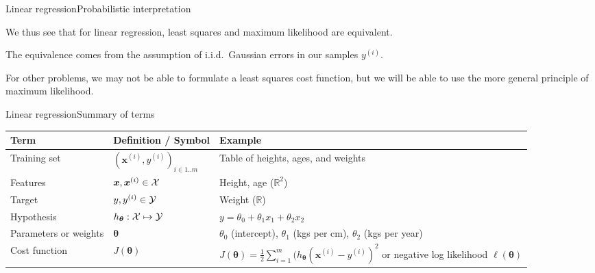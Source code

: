 \documentclass{beamer}
\renewcommand{\vec}[1]{\boldsymbol{#1}}
\def\Rset{\mathbb{R}}
\begin{document}
\begin{frame}{Linear regression}{Probabilistic interpretation}

  We thus see that for linear regression, \alert{least squares and
    maximum likelihood are equivalent}.

  \medskip

  The equivalence comes from the assumption of i.i.d.\ Gaussian errors
  in our samples $y^{(i)}$.
  
  \medskip

  For other problems, we may not be able to formulate a least squares
  cost function, but we will be able to use the more general principle of
  maximum likelihood.

\end{frame}


\begin{frame}{Linear regression}{Summary of terms}

  
  \begin{tabular}{>{\raggedright}p{}>{\raggedright}p{}>{\raggedright\arraybackslash}p{}}
    \hline
    \textbf{Term} & \textbf{Definition / Symbol} & \textbf{Example} \\
    \hline
    Training set & $(\vec{x}^{(i)},y^{(i)})_{i \in 1..m}$ & Table of heights, ages, and weights \\
    \hline
    Features & $\vec{x}, \vec{x}^{(i)} \in {\cal X}$ & Height, age ($\Rset^2$) \\
    \hline
    Target & $y, y^{(i)} \in {\cal Y}$ & Weight ($\Rset$) \\
    \hline
    Hypothesis & $h_{\vec{\theta}} : {\cal X} \mapsto {\cal Y}$ & $y = \theta_0 + \theta_1 x_1 + \theta_2 x_2$ \\
    \hline
    Parameters or weights & $\vec{\theta}$ & $\theta_0$ (intercept), $\theta_1$ (kgs per cm), $\theta_2$ (kgs per year) \\
    \hline
    Cost function & $J(\vec{\theta})$ & $J(\vec{\theta}) = \frac{1}{2}\sum_{i=1}^m(h_{\vec{\theta}}(\vec{x}^{(i)} - y^{(i)})^2$ or negative log likelihood $\ell(\vec{\theta})$ \\
    \hline
  \end{tabular}

\end{frame}
\end{document}
